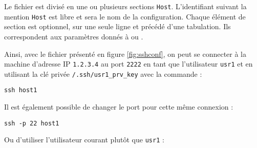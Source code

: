 Le fichier est divisé en une ou plusieurs sections \texttt{Host}. L'identifiant suivant la mention \texttt{Host} est libre et sera le nom de la configuration. Chaque élément de section est optionnel, sur une seule ligne et précédé d'une tabulation. Ils correspondent aux paramètres donnés à  ou .

Ainsi, avec le fichier présenté en figure \ref{fig:sshconf}, on peut se connecter à la machine d'adresse IP \texttt{1.2.3.4} au port \texttt{2222} en tant que l'utilisateur \texttt{usr1} et en utilisant la clé privée \texttt{\tilde/.ssh/usr1\_prv\_key} avec la commande : 
\begin{nscenter}
    \texttt{ssh host1}
\end{nscenter}
Il est également possible de changer le port pour cette même connexion : 
\begin{nscenter}
    \texttt{ssh -p 22 host1}
\end{nscenter}

Ou d'utiliser l'utilisateur courant plutôt que \texttt{usr1} :
